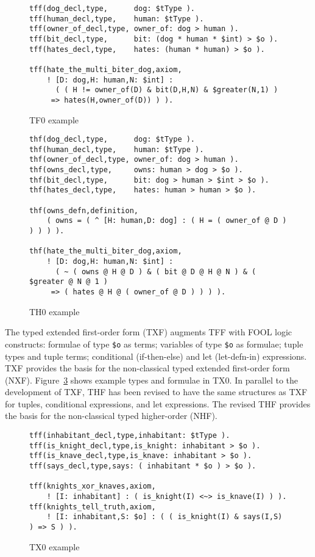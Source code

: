 \documentclass[runningheads]{llncs}
\begin{document}
\begin{figure}[htbp]
\small
{}
\begin{verbatim}
tff(dog_decl,type,      dog: $tType ).
tff(human_decl,type,    human: $tType ).
tff(owner_of_decl,type, owner_of: dog > human ).
tff(bit_decl,type,      bit: (dog * human * $int) > $o ).
tff(hates_decl,type,    hates: (human * human) > $o ).

tff(hate_the_multi_biter_dog,axiom,
    ! [D: dog,H: human,N: $int] :
      ( ( H != owner_of(D) & bit(D,H,N) & $greater(N,1) )
     => hates(H,owner_of(D)) ) ).
\end{verbatim}
\caption{TF0 example}
\label{TF0Example}
\end{figure}

\begin{figure}[htbp]
\small
{}
\begin{verbatim}
thf(dog_decl,type,      dog: $tType ).
thf(human_decl,type,    human: $tType ).
thf(owner_of_decl,type, owner_of: dog > human ).
thf(owns_decl,type,     owns: human > dog > $o ).
thf(bit_decl,type,      bit: dog > human > $int > $o ).
thf(hates_decl,type,    hates: human > human > $o ).

thf(owns_defn,definition,
    ( owns = ( ^ [H: human,D: dog] : ( H = ( owner_of @ D ) ) ) ) ).

thf(hate_the_multi_biter_dog,axiom,
    ! [D: dog,H: human,N: $int] :
      ( ~ ( owns @ H @ D ) & ( bit @ D @ H @ N ) & ( $greater @ N @ 1 ) 
     => ( hates @ H @ ( owner_of @ D ) ) ) ).
\end{verbatim}
\caption{TH0 example}
\label{TH0Example}
\end{figure}

The typed extended first-order form (TXF) \cite{SK18} augments TFF with FOOL logic \cite{KKV15} 
constructs:
formulae of type {\tt \$o} as terms; 
variables of type {\tt \$o} as formulae;
tuple types and tuple terms;
conditional (if-then-else) and let (let-defn-in) expressions.
TXF provides the basis for the non-classical typed extended first-order form (NXF).
Figure~\ref{TX0Example} shows example types and formulae in TX0.
In parallel to the development of TXF, THF has been revised to have the same structures as TXF 
for tuples, conditional expressions, and let expressions. 
The revised THF provides the basis for the non-classical typed higher-order (NHF).

\begin{figure}[htbp]
\small
{}
\begin{verbatim}
tff(inhabitant_decl,type,inhabitant: $tType ).
tff(is_knight_decl,type,is_knight: inhabitant > $o ).
tff(is_knave_decl,type,is_knave: inhabitant > $o ).
tff(says_decl,type,says: ( inhabitant * $o ) > $o ).

tff(knights_xor_knaves,axiom,
    ! [I: inhabitant] : ( is_knight(I) <~> is_knave(I) ) ).
tff(knights_tell_truth,axiom,
    ! [I: inhabitant,S: $o] : ( ( is_knight(I) & says(I,S) ) => S ) ).
\end{verbatim}
\caption{TX0 example}
\label{TX0Example}
\end{figure}
\end{document}
